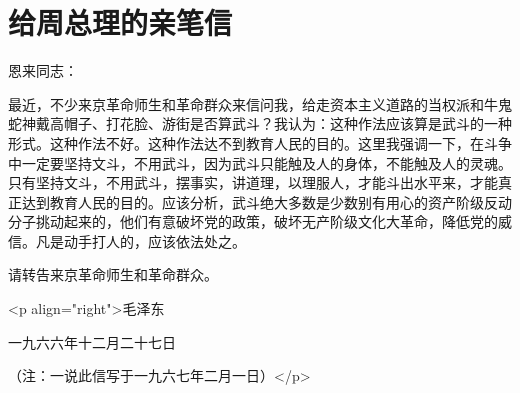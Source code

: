 \section[给周总理的亲笔信（一九六六年十二月二十七日）]{给周总理的亲笔信}


恩来同志：

最近，不少来京革命师生和革命群众来信问我，给走资本主义道路的当权派和牛鬼蛇神戴高帽子、打花脸、游街是否算武斗？我认为：这种作法应该算是武斗的一种形式。这种作法不好。这种作法达不到教育人民的目的。这里我强调一下，在斗争中一定要坚持文斗，不用武斗，因为武斗只能触及人的身体，不能触及人的灵魂。只有坚持文斗，不用武斗，摆事实，讲道理，以理服人，才能斗出水平来，才能真正达到教育人民的目的。应该分析，武斗绝大多数是少数别有用心的资产阶级反动分子挑动起来的，他们有意破坏党的政策，破坏无产阶级文化大革命，降低党的威信。凡是动手打人的，应该依法处之。

请转告来京革命师生和革命群众。

<p align="right">毛泽东

一九六六年十二月二十七日

（注：一说此信写于一九六七年二月一日）</p>


